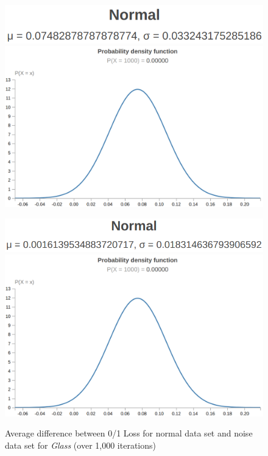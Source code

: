 \documentclass[twoside,11pt]{article}
\begin{document}
\begin{figure}[!hbp] %
    \centering
    \begin{minipage}[b]{0.3\textwidth}
        \includegraphics[width=\textwidth]{g-l-ms.png}
        \includegraphics[width=\textwidth]{g-l-ds.png}
        \caption{Average difference between 0/1 Loss for normal data set and noise data set for \emph{Glass} (over 1,000 iterations)}
    \end{minipage}
    \hfill
    \begin{minipage}[b]{0.3\textwidth}
        \includegraphics[width=\textwidth]{g-p-ms.png}
        \includegraphics[width=\textwidth]{g-l-ds.png}

\end{minipage}
\end{figure}
\end{document}
